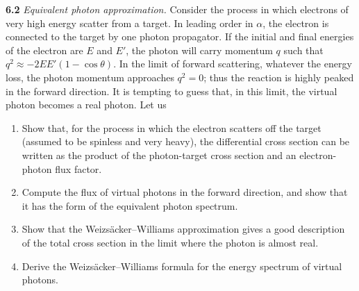 \textbf{6.2} \emph{Equivalent photon approximation.}  Consider the process in
which electrons of very high energy scatter from a target.  In leading order
in $\alpha$, the electron is connected to the target by one photon propagator.
If the initial and final energies of the electron are $E$ and $E'$, the photon
will carry momentum $q$ such that $q^2 \approx -2EE'(1-\cos\theta)$.  In the
limit of forward scattering, whatever the energy loss, the photon momentum
approaches $q^2 = 0$; thus the reaction is highly peaked in the forward
direction.  It is tempting to guess that, in this limit, the virtual photon
becomes a real photon.  Let us
\begin{enumerate}[label=(\alph*)]
  \item Show that, for the process in which the electron scatters off the
    target (assumed to be spinless and very heavy), the differential cross
    section can be written as the product of the photon-target cross section
    and an electron-photon flux factor.
  \item Compute the flux of virtual photons in the forward direction, and
    show that it has the form of the equivalent photon spectrum.
  \item Show that the Weizs\"acker--Williams approximation gives a good
    description of the total cross section in the limit where the photon is
    almost real.
  \item Derive the Weizs\"acker--Williams formula for the energy spectrum of
    virtual photons.
\end{enumerate}

